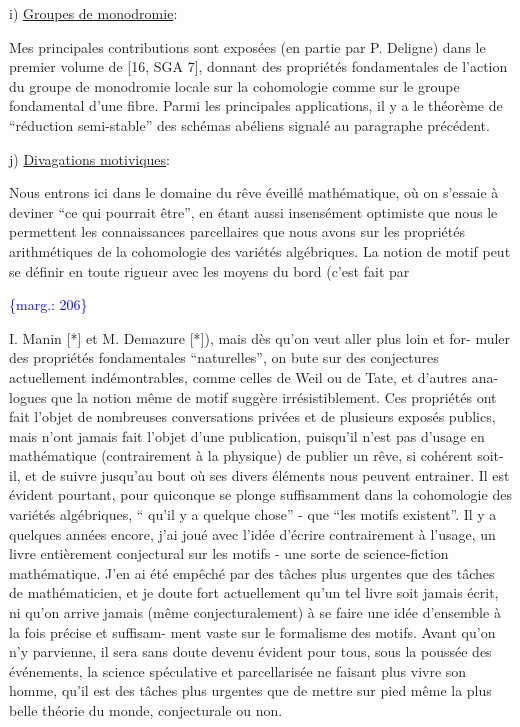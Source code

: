 \documentclass[11pt]{article}
\newcommand{\scanpage}[1]{\par\bigskip\noindent{\small\sffamily[scan #1]}\par}
\newcommand{\mspage}[1]{{\small\sffamily[p.\,#1]}}
\newcommand{\margin}[1]{\textcolor{blue}{\{\textsf{marg.:} #1\}}}
\newcommand{\uline}[1]{\underline{#1}}
\begin{document}
i) \uline{Groupes de monodromie}:

Mes principales contributions sont exposées (en partie par P. Deligne)
dans le premier volume de [16, SGA 7], donnant des propriétés fondamentales de
l'action du groupe de monodromie locale sur la cohomologie comme sur le groupe
fondamental d'une fibre. Parmi les principales applications, il y a le théorème
de ``réduction semi-stable'' des schémas abéliens signalé au paragraphe précédent.

j) \uline{Divagations motiviques}:

Nous entrons ici dans le domaine du rêve éveillé mathématique, où on
s'essaie à deviner ``ce qui pourrait être'', en étant aussi insensément optimiste
que nous le permettent les connaissances parcellaires que nous avons sur les
propriétés arithmétiques de la cohomologie des variétés algébriques. La notion
de motif peut se définir en toute rigueur avec les moyens du bord (c'est fait par

\margin{206}

\clearpage
\scanpage{119/207}
\mspage{- 12 -}

I. Manin [*] et M. Demazure [*]), mais dès qu'on veut aller plus loin et for-%
muler des propriétés fondamentales ``naturelles'', on bute sur des conjectures
actuellement indémontrables, comme celles de Weil ou de Tate, et d'autres ana-%
logues que la notion même de motif suggère irrésistiblement. Ces propriétés ont
fait l'objet de nombreuses conversations privées et de plusieurs exposés
publics, mais n'ont jamais fait l'objet d'une publication, puisqu'il n'est pas
d'usage en mathématique (contrairement à la physique) de publier un rêve, si
cohérent soit-il, et de suivre jusqu'au bout où ses divers éléments nous peuvent
entrainer. Il est évident pourtant, pour quiconque se plonge suffisamment dans
la cohomologie des variétés algébriques, `` qu'il y a quelque chose'' - que
``les motifs existent''. Il y a quelques années encore, j'ai joué avec l'idée
d'écrire contrairement à l'usage, un livre entièrement conjectural sur les
motifs - une sorte de science-fiction mathématique. J'en ai été empêché par
des tâches plus urgentes que des tâches de mathématicien, et je doute fort
actuellement qu'un tel livre soit jamais écrit, ni qu'on arrive jamais (même
conjecturalement) à se faire une idée d'ensemble à la fois précise et suffisam-%
ment vaste sur le formalisme des motifs. Avant qu'on n'y parvienne, il sera
sans doute devenu évident pour tous, sous la poussée des événements, la science
spéculative et parcellarisée ne faisant plus vivre son homme, qu'il est des
tâches plus urgentes que de mettre sur pied même la plus belle théorie du
monde, conjecturale ou non.
\end{document}

